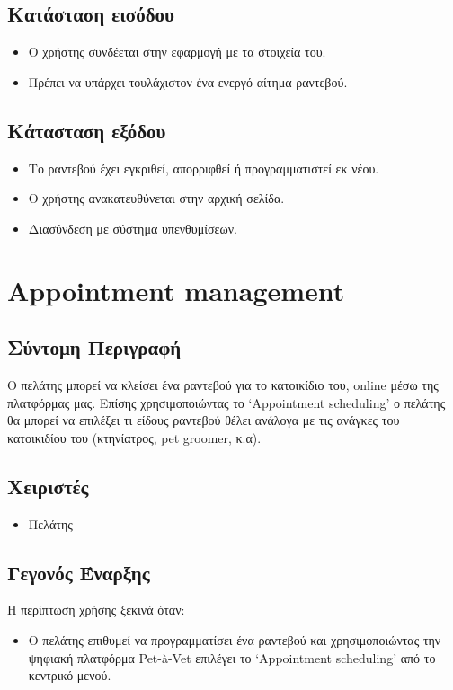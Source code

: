 \documentclass[12pt,a4paper,twoside]{book}
\begin{document}
\subsection{Κατάσταση εισόδου} %
\begin{itemize}
  \item Ο χρήστης συνδέεται στην εφαρμογή με τα στοιχεία του. %
  \item Πρέπει να υπάρχει τουλάχιστον ένα ενεργό αίτημα ραντεβού.
\end{itemize}

\subsection{Κάτασταση εξόδου} %
\begin{itemize}
  \item Το ραντεβού έχει εγκριθεί, απορριφθεί ή προγραμματιστεί εκ νέου.
  \item Ο χρήστης ανακατευθύνεται στην αρχική σελίδα. %
\end{itemize}

\begin{itemize}
  \item Διασύνδεση με σύστημα υπενθυμίσεων. %
\end{itemize}

\section{Appointment management}

\subsection{Σύντομη Περιγραφή}
Ο πελάτης μπορεί να κλείσει ένα ραντεβού για το κατοικίδιο του, online μέσω της πλατφόρμας μας. Επίσης χρησιμοποιώντας το ‘Appointment scheduling’ ο πελάτης θα μπορεί να επιλέξει τι είδους ραντεβού θέλει ανάλογα με τις ανάγκες του κατοικιδίου του (κτηνίατρος, pet groomer, κ.α). %

\subsection{Χειριστές}
\begin{itemize}
  \item Πελάτης
\end{itemize}

\subsection{Γεγονός Έναρξης}
Η περίπτωση χρήσης ξεκινά όταν:
\begin{itemize}
  \item Ο πελάτης επιθυμεί να προγραμματίσει ένα ραντεβού και χρησιμοποιώντας την ψηφιακή πλατφόρμα  Pet-à-Vet επιλέγει το ‘Appointment scheduling’ από το κεντρικό μενού. %
\end{itemize}
\end{document}
